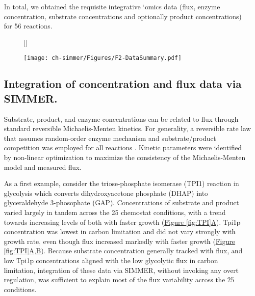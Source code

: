 In total, we obtained the requisite integrative `omics data (flux, enzyme concentration, substrate concentrations and optionally product concentrations) for 56 reactions.

\begin{figure}[H]
[\FBwidth]
{\caption[Summary of input data]{}\label{fig:dataSummary}}
{\texttt{[image: ch-simmer/Figures/F2-DataSummary.pdf]}}
\end{figure}

\subsection{Integration of concentration and flux data via SIMMER.}

Substrate, product, and enzyme concentrations can be related to flux through standard reversible Michaelis-Menten kinetics. For generality, a reversible rate law that assumes random-order enzyme mechanism and substrate/product competition was employed for all reactions \cite{Liebermeister:2006fm, Tummler:2014cp}. Kinetic parameters were identified by non-linear optimization to maximize the consistency of the Michaelis-Menten model and measured flux. 

As a first example, consider the triose-phosphate isomerase (TPI1) reaction in glycolysis which converts dihydroxyacetone phosphate (DHAP) into glyceraldehyde 3-phosophate (GAP). Concentrations of substrate and product varied largely in tandem across the 25 chemostat conditions, with a trend towards increasing levels of both with faster growth (\hyperref[fig:TPI]{Figure \ref{fig:TPI}A}). Tpi1p concentration was lowest in carbon limitation and did not vary strongly with growth rate, even though flux increased markedly with faster growth (\hyperref[fig:TPI]{Figure \ref{fig:TPI}A,B}). Because substrate concentration generally tracked with flux, and low Tpi1p concentrations aligned with the low glycolytic flux in carbon limitation, integration of these data via SIMMER, without invoking any overt regulation, was sufficient to explain most of the flux variability across the 25 conditions. 

